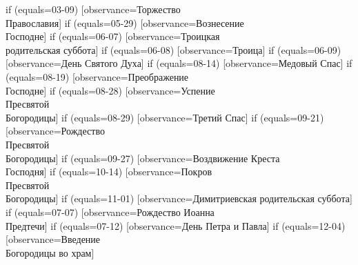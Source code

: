 {  if (equals=03-09) [observance=Торжество\\ Православия]
  if (equals=05-29) [observance=Вознесение\\ Господне]
  if (equals=06-07) [observance=Троицкая\\ родительская суббота]
  if (equals=06-08) [observance=Троица]
  if (equals=06-09) [observance=День Святого Духа]
  if (equals=08-14) [observance=Медовый Спас]
  if (equals=08-19) [observance=Преображение\\ Господне]
  if (equals=08-28) [observance=Успение\\ Пресвятой\\ Богородицы]
  if (equals=08-29) [observance=Третий Спас]
  if (equals=09-21) [observance=Рождество\\ Пресвятой\\ Богородицы]
  if (equals=09-27) [observance=Воздвижение Креста\\ Господня]
  if (equals=10-14) [observance=Покров\\ Пресвятой\\ Богородицы]
  if (equals=11-01) [observance=Димитриевская родительская суббота]
  if (equals=07-07) [observance=Рождество Иоанна\\ Предтечи]
  if (equals=07-12) [observance=День Петра и Павла]
  if (equals=12-04) [observance=Введение\\ Богородицы во храм]
}
